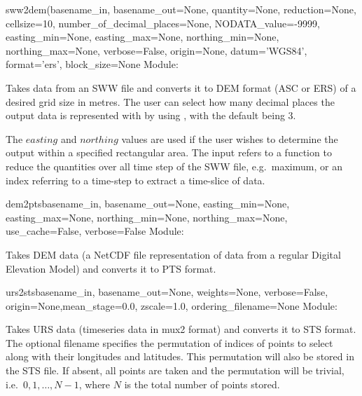\documentclass{manual}
\begin{document}
\begin{funcdesc}{sww2dem}{(basename_in,
            basename_out=None,
            quantity=None,
            reduction=None,
            cellsize=10,
            number_of_decimal_places=None,
            NODATA_value=-9999,
            easting_min=None,
            easting_max=None,
            northing_min=None,
            northing_max=None,
            verbose=False,
            origin=None,
            datum='WGS84',
            format='ers',
            block_size=None}
Module: 

Takes data from an SWW file  and converts it to DEM format (ASC or
ERS) of a desired grid size  in metres. The user can select how
many decimal places the output data is represented with by using ,
with the default being 3.

The $easting$ and $northing$ values are used if the user wishes to determine the output
within a specified rectangular area. The  input refers to a function
to reduce the quantities over all time step of the SWW file, e.g.\ maximum, or an index referring
to a time-step to extract a time-slice of data.

\end{funcdesc}

\begin{funcdesc}{dem2pts}{basename_in, basename_out=None,
            easting_min=None, easting_max=None,
            northing_min=None, northing_max=None,
            use_cache=False, verbose=False}
  Module: 

  Takes DEM data (a NetCDF file representation of data from a regular Digital
  Elevation Model) and converts it to PTS format.
\end{funcdesc}

\begin{funcdesc}{urs2sts}{basename_in, basename_out=None,
            weights=None, verbose=False,
            origin=None,mean_stage=0.0,
            zscale=1.0, ordering_filename=None}
  Module: 

  Takes URS data (timeseries data in mux2 format) and converts it to STS format.
  The optional filename  specifies the permutation of indices
  of points to select along with their longitudes and latitudes. This permutation will also be
  stored in the STS file. If absent, all points are taken and the permutation will be trivial,
  i.e.\ $0, 1, \ldots, N-1$, where $N$ is the total number of points stored.
\end{funcdesc}
\end{document}
